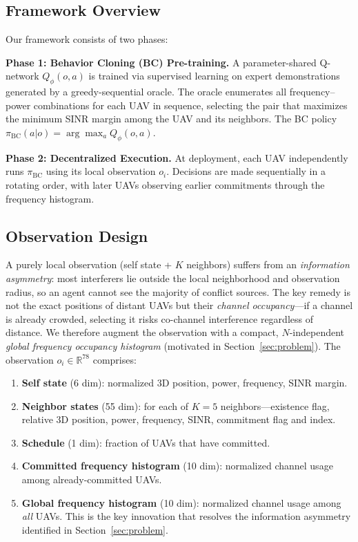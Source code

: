 \documentclass[journal]{IEEEtran}
\begin{document}
\subsection{Framework Overview}

Our framework consists of two phases:

\textbf{Phase 1: Behavior Cloning (BC) Pre-training.} A parameter-shared Q-network $Q_\phi(o, a)$ is trained via supervised learning on expert demonstrations generated by a greedy-sequential oracle. The oracle enumerates all frequency--power combinations for each UAV in sequence, selecting the pair that maximizes the minimum SINR margin among the UAV and its neighbors. The BC policy $\pi_{\text{BC}}(a|o) = \arg\max_a Q_\phi(o, a)$.

\textbf{Phase 2: Decentralized Execution.} At deployment, each UAV independently runs $\pi_{\text{BC}}$ using its local observation $o_i$. Decisions are made sequentially in a rotating order, with later UAVs observing earlier commitments through the frequency histogram.

\subsection{Observation Design}

A purely local observation (self state + $K$ neighbors) suffers from an \emph{information asymmetry}: most interferers lie outside the local neighborhood and observation radius, so an agent cannot see the majority of conflict sources. The key remedy is not the exact positions of distant UAVs but their \emph{channel occupancy}---if a channel is already crowded, selecting it risks co-channel interference regardless of distance. We therefore augment the observation with a compact, $N$-independent \emph{global frequency occupancy histogram} (motivated in Section~\ref{sec:problem}). The observation $o_i \in \mathbb{R}^{78}$ comprises:

\begin{enumerate}
    \item \textbf{Self state} (6 dim): normalized 3D position, power, frequency, SINR margin.
    \item \textbf{Neighbor states} (55 dim): for each of $K=5$ neighbors---existence flag, relative 3D position, power, frequency, SINR, commitment flag and index.
    \item \textbf{Schedule} (1 dim): fraction of UAVs that have committed.
    \item \textbf{Committed frequency histogram} (10 dim): normalized channel usage among already-committed UAVs.
    \item \textbf{Global frequency histogram} (10 dim): normalized channel usage among \emph{all} UAVs. This is the key innovation that resolves the information asymmetry identified in Section~\ref{sec:problem}.
\end{enumerate}
\end{document}
